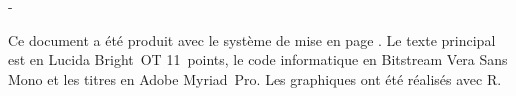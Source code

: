\thispagestyle{empty}
\vspace*{\fill}

\begingroup
\calccentering{\unitlength}
\begin{adjustwidth*}{\unitlength}{-\unitlength}
  \begin{flushleft}
    \small %
    Ce document a été produit avec le système de mise en page {\XeLaTeX}.
    Le texte principal est en Lucida Bright~OT 11~points, le code
    informatique en Bitstream Vera Sans Mono et les titres en Adobe
    Myriad~Pro. Les graphiques ont été réalisés avec R.
  \end{flushleft}
\end{adjustwidth*}
\endgroup
\vfill
